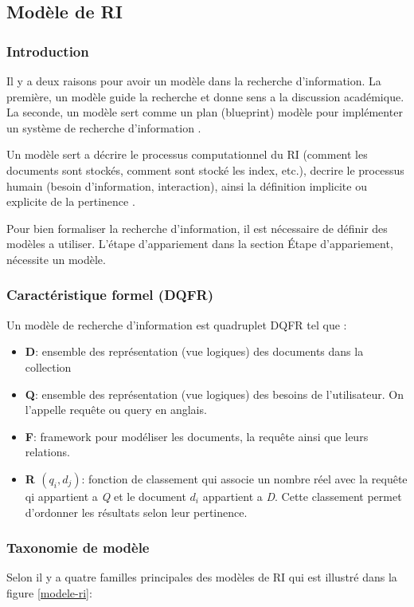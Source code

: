 \subsection{Modèle de RI}
\subsubsection{Introduction}
Il y a deux raisons pour avoir un modèle dans la recherche d'information. La première, un modèle guide la recherche et donne sens a la discussion académique. La seconde, un modèle sert comme un plan (blueprint) modèle pour implémenter un système de recherche d'information \citep{model-ir}.

Un modèle sert a décrire le processus computationnel du RI (comment les documents sont stockés, comment sont stocké les index, etc.), decrire le processus humain (besoin d'information, interaction), ainsi la définition implicite ou explicite de la pertinence \citep{model-ri-cours}.

Pour bien formaliser la recherche d'information, il est nécessaire de définir des modèles a utiliser. L'étape d’appariement dans la section Étape d'appariement, nécessite un modèle.

\subsubsection{Caractéristique formel (DQFR)}
\begin{definition}
    Un modèle de recherche d'information est quadruplet DQFR tel que \citep*{modern-ir, vsm}:
    \begin{itemize}
        \item \textbf{D}: ensemble des représentation (vue logiques) des documents dans la collection
        \item \textbf{Q}: ensemble des représentation (vue logiques) des besoins de l'utilisateur. On l'appelle requête ou query en anglais.
        \item \textbf{F}: framework pour modéliser les documents, la requête ainsi que leurs relations.
        \item \textbf{R $(q_{i}, d_{j})$}: fonction de classement qui associe un nombre réel avec la requête qi appartient a \textit{Q} et le document $d_{i}$ appartient a \textit{D}. Cette classement permet d'ordonner les résultats selon leur pertinence.
    \end{itemize}
\end{definition}

\subsubsection{Taxonomie de modèle}
Selon \citeauthor{modern-ir} il y a quatre familles principales des modèles de RI qui est illustré dans la figure \ref{modele-ri}:

